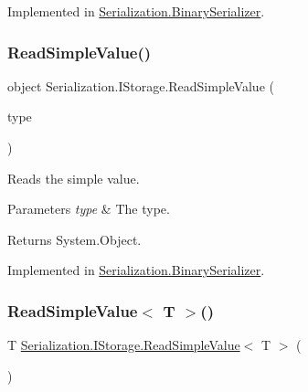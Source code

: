 Implemented in \hyperlink{class_serialization_1_1_binary_serializer_a611b0f83ba611a0ecf394a9920dbab1b}{Serialization.\+Binary\+Serializer}.

\mbox{\label{interface_serialization_1_1_i_storage_a32b60329697e7f1d128801cc4ac7e614}} 
\subsubsection{\texorpdfstring{Read\+Simple\+Value()}{ReadSimpleValue()}}
{\footnotesize\ttfamily object Serialization.\+I\+Storage.\+Read\+Simple\+Value (\begin{DoxyParamCaption}\item[{Type}]{type }\end{DoxyParamCaption})}



Reads the simple value. 


\begin{DoxyParams}{Parameters}
{\em type} & The type.\\
\hline
\end{DoxyParams}
\begin{DoxyReturn}{Returns}
System.\+Object.
\end{DoxyReturn}


Implemented in \hyperlink{class_serialization_1_1_binary_serializer_a7b85fa9bbbd8e2b9167abb58e45b2a82}{Serialization.\+Binary\+Serializer}.

\mbox{\label{interface_serialization_1_1_i_storage_ae1e7a60cc8b12071f1866d2cac454f99}} 
\subsubsection{\texorpdfstring{Read\+Simple\+Value$<$ T $>$()}{ReadSimpleValue< T >()}}
{\footnotesize\ttfamily T \hyperlink{interface_serialization_1_1_i_storage_a32b60329697e7f1d128801cc4ac7e614}{Serialization.\+I\+Storage.\+Read\+Simple\+Value}$<$ T $>$ (\begin{DoxyParamCaption}{ }\end{DoxyParamCaption})}



